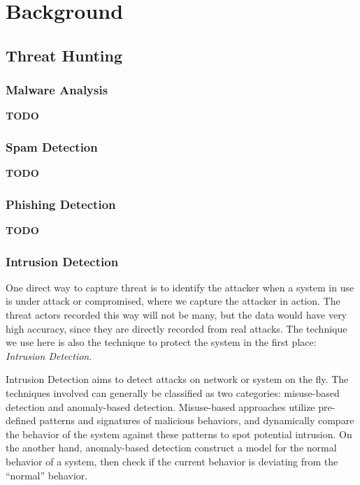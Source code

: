 \chapter{Background}
\label{chapter:background}

\section{Threat Hunting}
\subsection{Malware Analysis}
\textbf{TODO}

\subsection{Spam Detection}
\textbf{TODO}

\subsection{Phishing Detection}
\textbf{TODO}

\subsection{Intrusion Detection}

One direct way to capture threat is to identify the attacker when a 
system in use is under attack or compromised, where we capture the 
attacker in action. The threat actors recorded this way will not be 
many, but the data would have very high accuracy, since they are
directly recorded from real attacks. The technique we use here is also 
the technique to protect the system in the first place:
\textit{Intrusion Detection}.

Intrusion Detection aims to detect attacks on network or system on the
fly. The techniques involved can generally be classified as two 
categories: misuse-based detection and anomaly-based detection.
Misuse-based approaches utilize pre-defined patterns and signatures
of malicious behaviors, and dynamically compare the behavior of the
system against these patterns to spot potential intrusion. On the another
hand, anomaly-based detection construct a model for the normal behavior 
of a system, then check if the current behavior is deviating from the 
``normal'' behavior.


